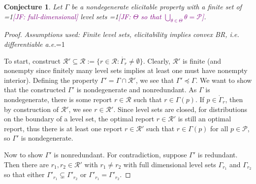\documentclass[12pt]{article}
\newcommand{\Comments}{1}
\newcommand{\mynote}[2]{\ifnum\Comments=1\textcolor{#1}{#2}\fi}
\newcommand{\mytodo}[2]{\ifnum\Comments=1%
  \todo[linecolor=#1!80!black,backgroundcolor=#1,bordercolor=#1!80!black]{#2}\fi}
\newcommand{\raft}[1]{\mytodo{green!20!white}{RF: #1}}
\newcommand{\jessie}[1]{\mynote{purple}{[JF: #1]}}
\renewcommand{\P}{\mathcal{P}}
\newcommand{\R}{\mathcal{R}}
\newcommand{\inter}[1]{\mathring{#1}}%
\newtheorem{conjecture}{Conjecture}
\begin{document}
\begin{conjecture}\label{conj:gam-prime-exists}
	Let $\Gamma$ be a nondegenerate elicitable property with a finite set of \jessie{full-dimensional} level sets \jessie{$\Theta$ so that $\bigcup_{\theta \in \Theta}\theta = \P$}.
\end{conjecture}
\begin{proof}
\emph{Assumptions used: Finite level sets, elicitability implies convex BR, i.e. differentiable a.e.}\raft{Confused by BR}

	To start, construct $\R' \subseteq \R := \{ r \in \R : \inter{\Gamma_r} \neq \emptyset \}$.
	Clearly, $\R'$ is finite (and nonempty since finitely many level sets implies at least one must have nonempty interior).
	Defining the property $\Gamma' = \Gamma\cap \R'$, we see that $\Gamma' \preceq \Gamma$.
	We want to show that the constructed $\Gamma'$ is nondegenerate and nonredundant.
	As $\Gamma$ is nondegenerate, there is some report $r \in \R$ such that $r \in \Gamma(p)$.
	If $p \in \inter{\Gamma}_r$, then by construction of $\R'$, we see $r \in \R'$.
	Since level sets are closed, for distributions on the boundary of a level set, the optimal report $r \in \R'$ is still an optimal report, thus there is at least one report $r \in \R'$ such that $r \in \Gamma(p)$ for all $p \in \P$, so $\Gamma'$ is nondegenerate. 

	
	
	Now to show $\Gamma'$ is nonredundant.
	For contradiction, suppose $\Gamma'$ is redundant.
	Then there are $r_1, r_2 \in \R'$ with $r_1 \neq r_2$ with full dimensional level sets $\Gamma_{r_1}$ and $\Gamma_{r_2}$ so that either $\Gamma'_{r_1} \subsetneq \Gamma'_{r_2}$ or $\Gamma'_{r_1} = \Gamma'_{r_2}$.
	

\end{proof}
\end{document}
